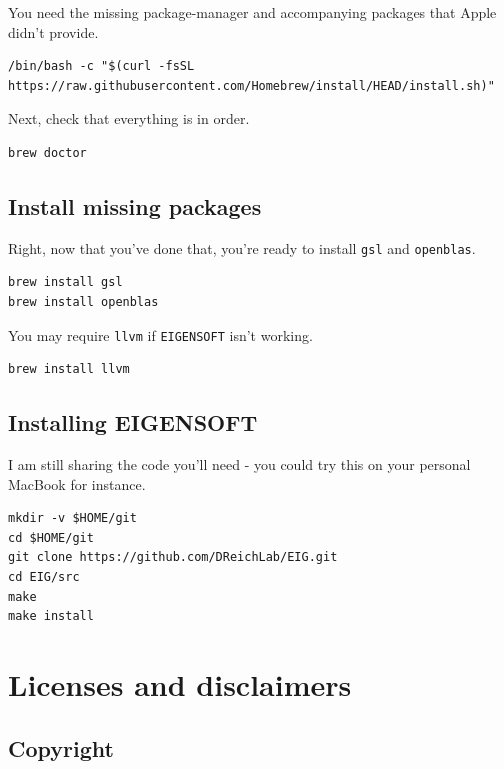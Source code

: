 \documentclass[
]{book}
\begin{document}
You need the missing package-manager and accompanying packages that Apple didn't provide.

\begin{verbatim}
/bin/bash -c "$(curl -fsSL https://raw.githubusercontent.com/Homebrew/install/HEAD/install.sh)"
\end{verbatim}

Next, check that everything is in order.

\begin{verbatim}
brew doctor
\end{verbatim}

\hypertarget{install-missing-packages}{%
\section{Install missing packages}\label{install-missing-packages}}

Right, now that you've done that, you're ready to install \texttt{gsl} and \texttt{openblas}.

\begin{verbatim}
brew install gsl
brew install openblas
\end{verbatim}

You may require \texttt{llvm} if \texttt{EIGENSOFT} isn't working.

\begin{verbatim}
brew install llvm
\end{verbatim}

\hypertarget{installing-eigensoft}{%
\section{Installing EIGENSOFT}\label{installing-eigensoft}}

I am still sharing the code you'll need - you could try this on your personal MacBook for instance.

\begin{verbatim}
mkdir -v $HOME/git
cd $HOME/git
git clone https://github.com/DReichLab/EIG.git
cd EIG/src
make
make install
\end{verbatim}

\hypertarget{license}{%
\chapter{Licenses and disclaimers}\label{license}}

\hypertarget{copyright}{%
\section{Copyright}\label{copyright}}
\end{document}
